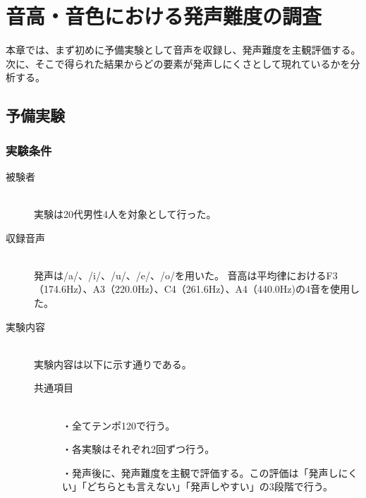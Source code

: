 \documentclass[10ptj,a4j,dvipdfmx,uplatex]{jsbook}
\begin{document}

\chapter{音高・音色における発声難度の調査}
本章では、まず初めに予備実験として音声を収録し、発声難度を主観評価する。
次に、そこで得られた結果からどの要素が発声しにくさとして現れているかを分析する。
\section{予備実験}
\subsection{実験条件}
\begin{description}
    \item[被験者]\mbox{}\\
        実験は20代男性4人を対象として行った。
    \item[収録音声]\mbox{}\\
        発声は/a/、/i/、/u/、/e/、/o/を用いた。
        音高は平均律におけるF3（174.6Hz）、A3（220.0Hz）、C4（261.6Hz）、A4（440.0Hz)の4音を使用した。
    \item[実験内容]\mbox{}\\
        実験内容は以下に示す通りである。
        \begin{description}
            \item[共通項目]\mbox{}\\
                ・全てテンポ120で行う。
                
                ・各実験はそれぞれ2回ずつ行う。
                
                ・発声後に、発声難度を主観で評価する。この評価は「発声しにくい」「どちらとも言えない」「発声しやすい」の3段階で行う。
                

\end{description}
\end{description}
\end{document}
